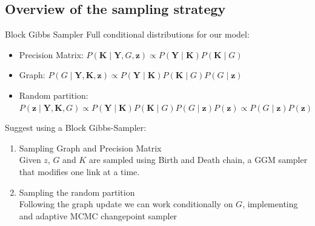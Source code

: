 \subsection{Overview of the sampling strategy}
\begin{frame}{Block Gibbs Sampler}
    Full conditional distributions for our model:
    \begin{itemize}
        \item Precision Matrix: $P(\bm{K} \mid \bm{Y},G,\bm{z}) \propto P(\bm{Y} \mid \bm{K})P(\bm{K} \mid {G})$ 

        \item Graph: $P(G \mid \bm{Y},\bm{K},\bm{z}) \propto P(\bm{Y} \mid \bm{K})P(\bm{K} \mid {G})P(G \mid \bm{z})$ 

        \item Random partition: $P(\bm{z} \mid \bm{Y},\bm{K},G) \propto P(\bm{Y} \mid \bm{K})P(\bm{K} \mid {G})P(G \mid \bm{z})P(\bm{z}) \propto P(G \mid \bm{z})P(\bm{z}) $
    \end{itemize}

    Suggest using a Block Gibbs-Sampler:
    \begin{enumerate}
        \item \alert{Sampling Graph and Precision Matrix}\\
        Given $z$, $G$ and $K$ are sampled using Birth and Death chain, a GGM sampler that modifies one link at a time.
        \item \alert{Sampling the random partition}\\
        Following the graph update we can work conditionally on $G$, implementing and adaptive MCMC changepoint sampler
    \end{enumerate}
\end{frame}




